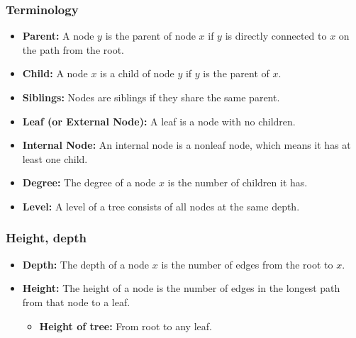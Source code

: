     \subsubsection{Terminology}
    \begin{terminology}
        \begin{itemize}            
            \item \textbf{Parent:} A node \( y \) is the parent of node \( x \) if \( y \) is directly connected to \( x \) on the path from the root.
            
            \item \textbf{Child:} A node \( x \) is a child of node \( y \) if \( y \) is the parent of \( x \).
            
            \item \textbf{Siblings:} Nodes are siblings if they share the same parent.
            
            \item \textbf{Leaf (or External Node):} A leaf is a node with no children.
            
            \item \textbf{Internal Node:} An internal node is a nonleaf node, which means it has at least one child.
            
            \item \textbf{Degree:} The degree of a node \( x \) is the number of children it has.
            
            \item \textbf{Level:} A level of a tree consists of all nodes at the same depth.
            
        \end{itemize}
    \end{terminology}

    \subsubsection{Height, depth}
    \begin{definition}
        \begin{itemize}
            \item \textbf{Depth:} The depth of a node \( x \) is the number of edges from the root to \( x \).
            
            \item \textbf{Height:} The height of a node is the number of edges in the longest path from that node to a leaf.
            \begin{itemize}
                \item \textbf{Height of tree:} From root to any leaf.
            \end{itemize}
        \end{itemize}

    \end{definition}

